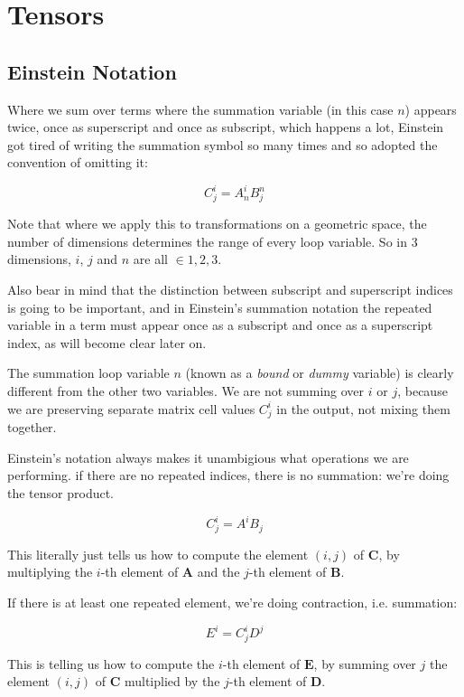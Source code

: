 \chapter{Tensors} \label{ch:tensors}

\section{Einstein Notation}

Where we sum over terms where the summation variable (in this case $n$) appears twice, once as superscript and once as subscript, which happens a lot, Einstein got tired of writing the summation symbol so many times and so adopted the convention of omitting it:

$$C^i_j = A^i_nB^n_j$$

Note that where we apply this to transformations on a geometric space, the number of dimensions determines the range of every loop variable. So in 3 dimensions, $i$, $j$ and $n$ are all $\in {1, 2, 3}$.

Also bear in mind that the distinction between subscript and superscript indices is going to be important, and in Einstein's summation notation the repeated variable in a term must appear once as a subscript and once as a superscript index, as will become clear later on.

The summation loop variable $n$ (known as a \textit{bound} or \textit{dummy} variable) is clearly different from the other two variables. We are not summing over $i$ or $j$, because we are preserving separate matrix cell values $C^i_j$ in the output, not mixing them together.

Einstein's notation always makes it unambigious what operations we are performing. if there are no repeated indices, there is no summation: we're doing the tensor product.

$$C^i_j = A^iB_{j}$$

This literally just tells us how to compute the element $(i, j)$ of $\boldsymbol{C}$, by multiplying the $i$-th element of $\boldsymbol{A}$ and the $j$-th element of $\boldsymbol{B}$.

If there is at least one repeated element, we're doing contraction, i.e. summation:

$$E^i = C^i_jD^j$$

This is telling us how to compute the $i$-th element of $\boldsymbol{E}$, by summing over $j$ the element $(i, j)$ of $\boldsymbol{C}$ multiplied by the $j$-th element of $\boldsymbol{D}$.

